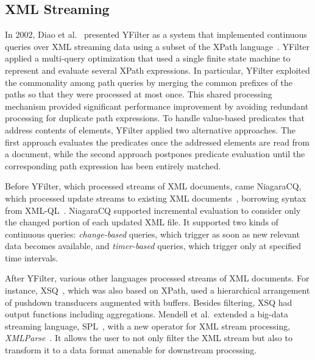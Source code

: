 \subsection{XML Streaming}\label{sec:xml} %

In 2002, Diao et al.~\cite{diao_et_al_2002,diao2003high} presented
YFilter as a system that implemented continuous queries over XML
streaming data using a subset of the XPath
language~\cite{clark_derose_1999}. YFilter applied a multi-query
optimization that used a single finite state machine to represent and
evaluate several XPath expressions. In particular, YFilter exploited
the commonality among path queries by merging the common prefixes of
the paths so that they were processed at most once. This shared
processing mechanism provided significant performance improvement by
avoiding redundant processing for duplicate path expressions.  To
handle value-based predicates that address contents of elements,
YFilter applied two alternative approaches. The first approach
evaluates the predicates once the addressed elements are read from a
document, while the second approach postpones predicate evaluation
until the corresponding path expression has been entirely matched.

Before YFilter, which processed streams of XML documents, came
NiagaraCQ, which processed update streams to existing XML
documents~\cite{chen_et_al_2000}, borrowing syntax from
XML-QL~\cite{deutsch1999query}.  NiagaraCQ supported incremental
evaluation to consider only the changed portion of each updated XML
file. It supported two kinds of continuous queries:
\emph{change-based} queries, which trigger as soon as new relevant
data becomes available, and \emph{timer-based} queries, which trigger
only at specified time intervals.

After YFilter, various other languages processed streams of XML
documents.  For instance, XSQ~\cite{peng_chawathe_2003}, which was
also based on XPath, used a hierarchical arrangement of pushdown
transducers augmented with buffers. Besides filtering, XSQ had output
functions including aggregations.  Mendell et al.\ extended a big-data
streaming language, SPL~\cite{hirzel_schneider_gedik_2017}, with a new
operator for XML stream processing,
\emph{XMLParse}~\cite{mendell_et_al_2012}. It allows the user to not
only filter the XML stream but also to transform it to a data format
amenable for downstream processing.

